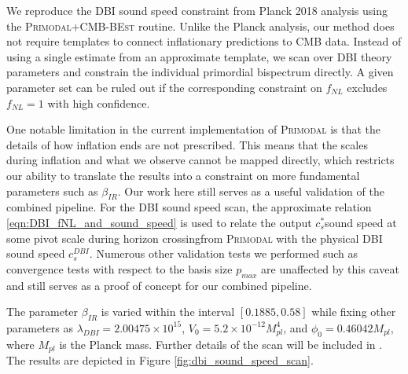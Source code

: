 We reproduce the DBI sound speed constraint from Planck 2018 analysis using the \textsc{Primodal}$+$\textsc{CMB-BEst} routine. Unlike the Planck analysis, our method does not require templates to connect inflationary predictions to CMB data. Instead of using a single estimate from an approximate template, we scan over DBI theory parameters and constrain the individual primordial bispectrum directly. A given parameter set can be ruled out if the corresponding constraint on $f_{NL}$ excludes $f_{NL}=1$ with high confidence. 

One notable limitation in the current implementation of \textsc{Primodal} is that the details of how inflation ends are not prescribed. This means that the scales during inflation and what we observe cannot be mapped directly, which restricts our ability to translate the results into a constraint on more fundamental parameters such as $\beta_{IR}$. Our work here still serves as a useful validation of the combined pipeline. For the DBI sound speed scan, the approximate relation \eqref{eqn:DBI_fNL_and_sound_speed} is used to relate the output $c^*_s$\textemdash sound speed at some pivot scale during horizon crossing\textemdash from \textsc{Primodal} with the physical DBI sound speed $c^{DBI}_s$. Numerous other validation tests we performed such as convergence tests with respect to the basis size $p_{max}$ are unaffected by this caveat and still serves as a proof of concept for our combined pipeline.

The parameter $\beta_{IR}$ is varied within the interval $[0.1885,0.58]$ while fixing other parameters as $\lambda_{DBI} = 2.00475 \times 10^15$, $V_0 = 5.2 \times 10^{-12} M^4_{pl}$, and $\phi_0 = 0.46042 M_{pl}$, where $M_{pl}$ is the Planck mass. Further details of the scan will be included in \cite{Sohn2021inprep}. The results are depicted in Figure \ref{fig:dbi_sound_speed_scan}.

